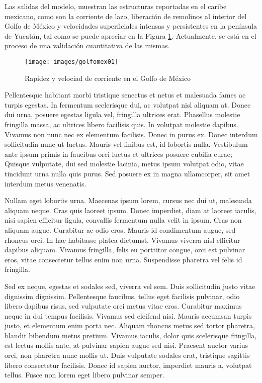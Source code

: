 \documentclass[
]{article}
\begin{document}
Las salidas del modelo, muestran las estructuras reportadas en el caribe mexicano, como son la corriente de lazo, liberación de remolinos al interior del Golfo de México y velocidades superficiales intensas y persistentes en la península de Yucatán, tal como se puede apreciar en la Figura \ref{fig:Mapa03}. Actualmente, se está en el proceso de una validación cuantitativa de las mismas.

\begin{figure}
\texttt{[image: images/golfomex01]} \caption{Rapidez y velociad de corriente en el Golfo de México}\label{fig:Mapa03}
\end{figure}

Pellentesque habitant morbi tristique senectus et netus et malesuada fames ac turpis egestas. In fermentum scelerisque dui, ac volutpat nisl aliquam at. Donec dui urna, posuere egestas ligula vel, fringilla ultrices erat. Phasellus molestie fringilla massa, ac ultrices libero facilisis quis. In volutpat molestie dapibus. Vivamus non nunc nec ex elementum facilisis. Donec in purus ex. Donec interdum sollicitudin nunc ut luctus. Mauris vel finibus est, id lobortis nulla. Vestibulum ante ipsum primis in faucibus orci luctus et ultrices posuere cubilia curae; Quisque vulputate, dui sed molestie lacinia, metus ipsum volutpat odio, vitae tincidunt urna nulla quis purus. Sed posuere ex in magna ullamcorper, sit amet interdum metus venenatis.

Nullam eget lobortis urna. Maecenas ipsum lorem, cursus nec dui ut, malesuada aliquam neque. Cras quis laoreet ipsum. Donec imperdiet, diam at laoreet iaculis, nisi sapien efficitur ligula, convallis fermentum nulla velit in ipsum. Cras non aliquam augue. Curabitur ac odio eros. Mauris id condimentum augue, sed rhoncus orci. In hac habitasse platea dictumst. Vivamus viverra nisl efficitur dapibus aliquam. Vivamus fringilla, felis eu porttitor congue, orci est pulvinar eros, vitae consectetur tellus enim non urna. Suspendisse pharetra vel felis id fringilla.

Sed ex neque, egestas et sodales sed, viverra vel sem. Duis sollicitudin justo vitae dignissim dignissim. Pellentesque faucibus, tellus eget facilisis pulvinar, odio libero dapibus risus, sed vulputate orci metus vitae eros. Curabitur maximus neque in dui tempus facilisis. Vivamus sed eleifend nisi. Mauris accumsan turpis justo, et elementum enim porta nec. Aliquam rhoncus metus sed tortor pharetra, blandit bibendum metus pretium. Vivamus iaculis, dolor quis scelerisque fringilla, est lectus mollis ante, at pulvinar sapien augue sed nisi. Praesent auctor varius orci, non pharetra nunc mollis ut. Duis vulputate sodales erat, tristique sagittis libero consectetur facilisis. Donec id sapien auctor, imperdiet mauris a, volutpat tellus. Fusce non lorem eget libero pulvinar semper.
\end{document}
